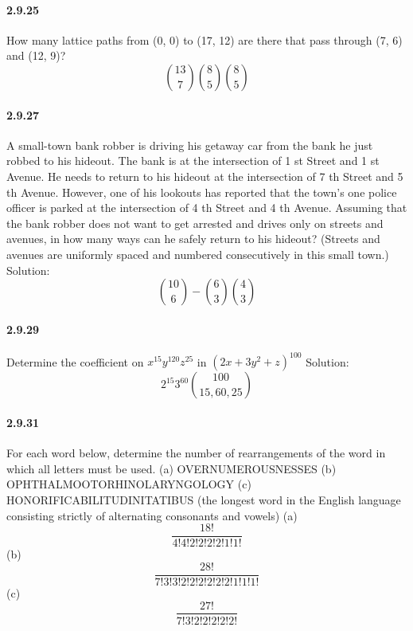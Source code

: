 \documentclass{article}
\begin{document}
\paragraph{2.9.25}
How many lattice paths from (0, 0) to (17, 12) are there that pass through (7, 6) and
(12, 9)?
\newline
$$\binom{13}{7} \binom{8}{5} \binom{8}{5}$$
\paragraph{2.9.27}A small-town bank robber is driving his getaway car from the bank he just robbed
to his hideout. The bank is at the intersection of 1
st Street and 1
st Avenue. He needs
to return to his hideout at the intersection of 7
th Street and 5
th Avenue. However, one
of his lookouts has reported that the town’s one police officer is parked at the intersection of 4
th Street and 4
th Avenue. Assuming that the bank robber does not want to
get arrested and drives only on streets and avenues, in how many ways can he safely return to his hideout? (Streets and avenues are uniformly spaced and numbered consecutively in this small town.)\newline
Solution:
$$\binom{10}{6}-\binom{6}{3} \binom{4}{3}$$
\paragraph{2.9.29}
Determine the coefficient on $x^{15}y^{120}z^{25}$ in $(2x+3y^2+z)^{100}$\newline
Solution:\newline
$$2^{15}3^{60}\binom{100}{15,60,25}$$
\paragraph{2.9.31}
For each word below, determine the number of rearrangements of the word in
which all letters must be used.\newline
(a) OVERNUMEROUSNESSES \newline
(b) OPHTHALMOOTORHINOLARYNGOLOGY \newline
(c) HONORIFICABILITUDINITATIBUS (the longest word in the English language
consisting strictly of alternating consonants and vowels)\newline
(a) $$\frac{18!}{4!4!2!2!2!2!1!1!}$$
(b)$$\frac{28!}{7!3!3!2!2!2!2!2!2!1!1!1!}$$
(c)$$\frac{27!}{7!3!2!2!2!2!2!}$$
\end{document}
